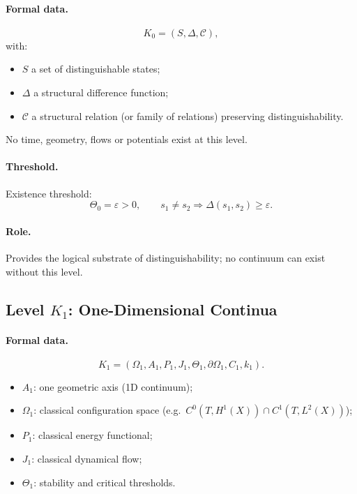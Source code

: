 \paragraph{Formal data.}
\[
    K_0 = (S,\Delta,\mathcal{C}),
\]
with:
\begin{itemize}
    \item \(S\) a set of distinguishable states;
    \item \(\Delta\) a structural difference function;
    \item \(\mathcal{C}\) a structural relation (or family of relations)
          preserving distinguishability.
\end{itemize}

No time, geometry, flows or potentials exist at this level.

\paragraph{Threshold.}
Existence threshold:
\[
   \Theta_0 = \varepsilon > 0,
   \qquad
   s_1 \neq s_2 \Rightarrow \Delta(s_1,s_2) \ge \varepsilon.
\]

\paragraph{Role.}
Provides the logical substrate of distinguishability;
no continuum can exist without this level.


\subsection{Level \texorpdfstring{\texorpdfstring{$K_1$}{K\_1}}{K1}: One-Dimensional Continua}

\paragraph{Formal data.}
\[
    K_1 = (\Omega_1, A_1, P_1, J_1, \Theta_1,
           \partial\Omega_1, C_1, k_1).
\]

\begin{itemize}
    \item \(A_1\): one geometric axis (1D continuum);
    \item \(\Omega_1\): classical configuration space
          (e.g.\ \(C^0(T,H^1(X))\cap C^1(T,L^2(X))\));
    \item \(P_1\): classical energy functional;
    \item \(J_1\): classical dynamical flow;
    \item \(\Theta_1\): stability and critical thresholds.
\end{itemize}

